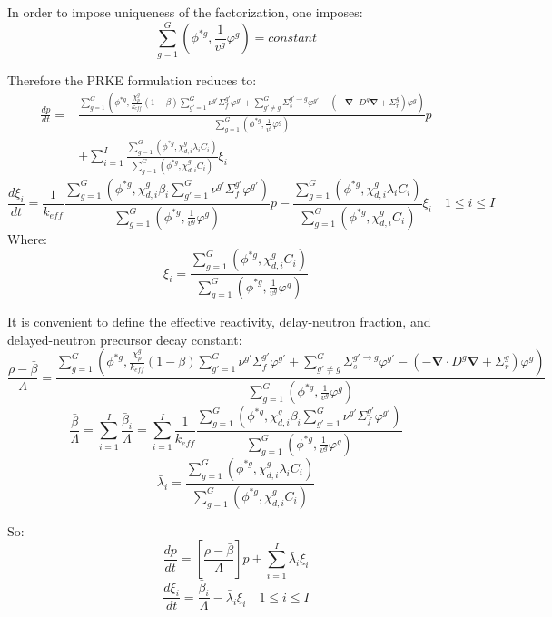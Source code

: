 \documentclass[12pt]{scrartcl}
\renewcommand{\div}{\bs{\nabla}\! \cdot \!}
\newcommand{\grad}{\bs{\nabla}}
\newcommand{\bs}[1]{\mathbf{#1}}
\newcommand{\keff}{k_\textit{eff}}
\newcommand{\be}{\begin{equation}}
\newcommand{\ee}{\end{equation}}
\begin{document}
In order to impose uniqueness of the factorization, one imposes:
\be
\sum_{g=1}^G\left(\phi^{*g},\frac{1}{v^g}\varphi^g\right)=constant
\ee

Therefore the PRKE formulation reduces to:
\begin{align}
\frac{dp}{dt}= &\frac{\sum_{g=1}^G\left(\phi^{*g},\frac{\chi_p^g}{\keff}(1-\beta) \sum_{g'=1}^G  \nu^{g'} \Sigma_f^{g'} \varphi^{g'} + \sum_{g'\neq g}^G\Sigma_s^{g'\to g}  \varphi^{g'} - \left( -\div D^g \grad  + \Sigma_r^g \right) \varphi^g\right)}{\sum_{g=1}^G\left(\phi^{*g},\frac{1}{v^g}\varphi^g\right)}p \nonumber \\ 
& +\sum_{i=1}^I\frac{\sum_{g=1}^G(\phi^{*g},\chi_{d,i}^g\lambda_i C_i)}{\sum_{g=1}^G(\phi^{*g},\chi_{d,i}^gC_i)}\xi_i
\end{align}
\be
\frac{d\xi_i}{dt}=\frac{1}{\keff}\frac{\sum_{g=1}^G(\phi^{*g},\chi_{d,i}^g\beta_i\sum_{g'=1}^G\nu^{g'} \Sigma_f^{g' }\varphi^{g'})}{\sum_{g=1}^G\left(\phi^{*g},\frac{1}{v^g}\varphi^g\right)}p - \frac{\sum_{g=1}^G(\phi^{*g},\chi_{d,i}^g\lambda_iC_i)}{\sum_{g=1}^G(\phi^{*g},\chi_{d,i}^gC_i)}\xi_i \quad 1 \le i \le I 
\ee
Where:
\be
\xi_i=\frac{\sum_{g=1}^G(\phi^{*g},\chi_{d,i}^g C_i)}{\sum_{g=1}^G\left(\phi^{*g},\frac{1}{v^g}\varphi^g\right)}
\ee

It is convenient to define the effective reactivity, delay-neutron fraction, and delayed-neutron precursor decay constant:
\be
\frac{\rho-\bar{\beta}}{\Lambda}=\frac{ \sum_{g=1}^G\left(\phi^{*g},\frac{\chi_p^g}{\keff}(1-\beta)\sum_{g'=1}^G \nu^{g'} \Sigma_f^{g'}\varphi^{g'} + \sum_{g'\neq g}^G\Sigma_s^{g'\to g} \varphi^{g'} -\left( -\div D^g \grad  + \Sigma_r^g \right)\varphi^g\right)}{\sum_{g=1}^G\left(\phi^{*g},\frac{1}{v^g}\varphi^g\right)}
\label{eq:rmb}
\ee
\be
\frac{\bar{\beta}}{\Lambda}=\sum_{i=1}^I\frac{\bar{\beta}_i}{\Lambda}=\sum_{i=1}^I\frac{1}{\keff}\frac{\sum_{g=1}^G(\phi^{*g}, \chi_{d,i}^g\beta_i\sum_{g'=1}^G\nu^{g'} \Sigma_f^{g' }\varphi^{g'})}{\sum_{g=1}^G\left(\phi^{*g},\frac{1}{v^g}\varphi^g\right)}
\label{eq:b}
\ee
\be
\bar{\lambda}_i=\frac{\sum_{g=1}^G(\phi^{*g},\chi_{d,i}^g\lambda_i C_i)}{\sum_{g=1}^G(\phi^{*g},\chi_{d,i}^gC_i)}
\label{eq:l}
\ee

So:
\be
\frac{dp}{dt}=\left[\frac{\rho-\bar{\beta}}{\Lambda}\right]p+\sum_{i=1}^I\bar{\lambda}_i\xi_i
\label{eq:p}
\ee
\be
\frac{d\xi_i}{dt}=\frac{\bar{\beta}_i}{\Lambda}-\bar{\lambda}_i\xi_i \quad 1 \le i \le I 
\label{eq:c}
\ee
\end{document}
